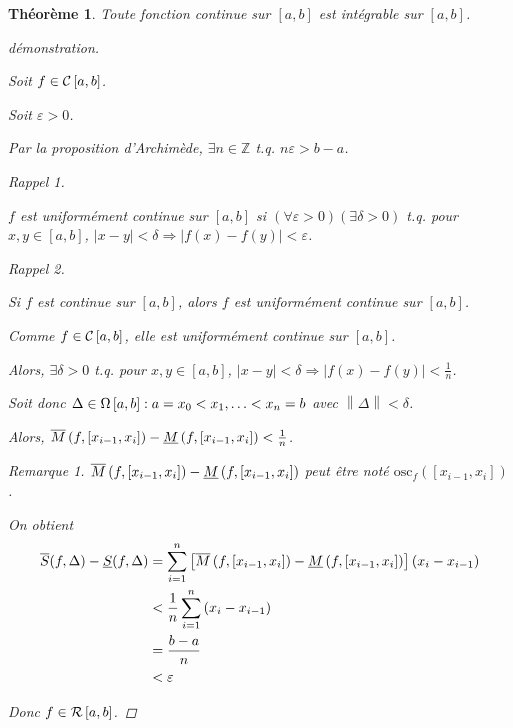 \documentclass{report}
\newcommand*{\norme}[1]{\left\| #1 \right\|}
\newcommand*{\abs}[1]{\left| #1 \right|}
\newcommand*{\eps}{\varepsilon}
\newcommand*{\entiers}{\mathbb{Z}}
\newtheorem*{thm}{Th\'eor\`eme}
\theoremstyle{definition}
\theoremstyle{remark}
\newtheorem*{rema}{Remarque}
\newtheorem*{rapp}{Rappel}
\begin{document}
	\begin{thm}
		Toute fonction continue sur $[a,b]$ est int\'egrable sur $[a,b]$.
		\begin{proof}[d\'emonstration]~

			Soit $f \in \continue$.

			Soit $\eps>0$.

			Par la proposition d'Archim\`ede, $\exists n\in\entiers$ t.q. $n\eps>b-a$.

			\begin{rapp}~

				$f$ est uniform\'ement continue sur $[a,b]$ si $\left( \forall\eps>0 \right) \left( \exists\delta>0 \right)$ t.q. pour $x,y \in [a,b]$, $\abs{x-y}<\delta \Rightarrow \abs{f(x)-f(y)}<\eps$.
			\end{rapp}
			\begin{rapp}~

				Si $f$ est continue sur $[a,b]$, alors $f$ est uniform\'ement continue sur $[a,b]$.
			\end{rapp}

			Comme $f \in \continue$, elle est uniform\'ement continue sur $[a,b]$.

			Alors, $\exists\delta>0$ t.q. pour $x,y \in [a,b]$, $\abs{x-y}<\delta \Rightarrow \abs{f(x)-f(y)}<\frac{1}{n}$.

			Soit donc $\Delta \in \partitions: a=x_0<x_1,\dotsc<x_n=b$ avec $\norme{\Delta}<\delta$.

			Alors, $\msup{f}[x_{i-1},x_i] - \minf{f}[x_{i-1},x_i]<\frac{1}{n}$.
			\begin{rema}
				$\msup{f}[x_{i-1},x_i] - \minf{f}[x_{i-1},x_i]$ peut \^etre not\'e $\mathrm{osc}_f(\left[ x_{i-1},x_i \right])$.
			\end{rema}

			On obtient
			\begin{align*}
				\ssup{f}-\sinf{f}&= \sum_{i=1}^{n}\left[ \msup{f}[x_{i-1},x_i] - \minf{f}[x_{i-1},x_i] \right] \left( x_i-x_{i-1} \right)\\
				&< \dfrac{1}{n} \sum_{i=1}^{n}\left( x_i-x_{i-1} \right)\\
				&=\dfrac{b-a}{n}\\
				&< \eps
			\end{align*}

			Donc $f \in \riemann$.
		\end{proof}
	\end{thm}
\end{document}
